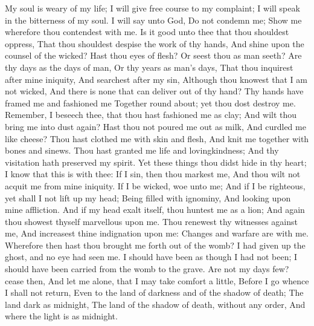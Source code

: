 My soul is weary of my life; I will give free course to my complaint; I will speak in the bitterness of my soul.  I will say unto God, Do not condemn me; Show me wherefore thou contendest with me.  Is it good unto thee that thou shouldest oppress, That thou shouldest despise the work of thy hands, And shine upon the counsel of the wicked?  Hast thou eyes of flesh? Or seest thou as man seeth?  Are thy days as the days of man, Or thy years as man’s days,  That thou inquirest after mine iniquity, And searchest after my sin,  Although thou knowest that I am not wicked, And there is none that can deliver out of thy hand?  Thy hands have framed me and fashioned me Together round about; yet thou dost destroy me.  Remember, I beseech thee, that thou hast fashioned me as clay; And wilt thou bring me into dust again?  Hast thou not poured me out as milk, And curdled me like cheese?  Thou hast clothed me with skin and flesh, And knit me together with bones and sinews.  Thou hast granted me life and lovingkindness; And thy visitation hath preserved my spirit.  Yet these things thou didst hide in thy heart; I know that this is with thee:  If I sin, then thou markest me, And thou wilt not acquit me from mine iniquity.  If I be wicked, woe unto me; And if I be righteous, yet shall I not lift up my head; Being filled with ignominy, And looking upon mine affliction.  And if my head exalt itself, thou huntest me as a lion; And again thou showest thyself marvellous upon me.  Thou renewest thy witnesses against me, And increasest thine indignation upon me: Changes and warfare are with me.  Wherefore then hast thou brought me forth out of the womb? I had given up the ghost, and no eye had seen me.  I should have been as though I had not been; I should have been carried from the womb to the grave.  Are not my days few? cease then, And let me alone, that I may take comfort a little,  Before I go whence I shall not return, Even to the land of darkness and of the shadow of death;  The land dark as midnight, The land of the shadow of death, without any order, And where the light is as midnight. 

